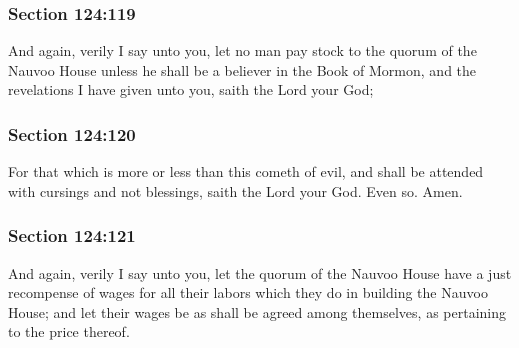 	\subsubsection{Section 124:119} %
		\label{DC124-119}

		And again, verily I say unto you, let no man pay stock to the quorum of the Nauvoo House unless he shall be a believer in the Book of Mormon, and the revelations I have given unto you, saith the Lord your God;


	\subsubsection{Section 124:120} %
		\label{DC124-120}

		For that which is more or less than this cometh of evil, and shall be attended with cursings and not blessings, saith the Lord your God.  Even so.  Amen.


	\subsubsection{Section 124:121} %
		\label{DC124-121}

		And again, verily I say unto you, let the quorum of the Nauvoo House have a just recompense of wages for all their labors which they do in building the Nauvoo House; and let their wages be as shall be agreed among themselves, as pertaining to the price thereof.


